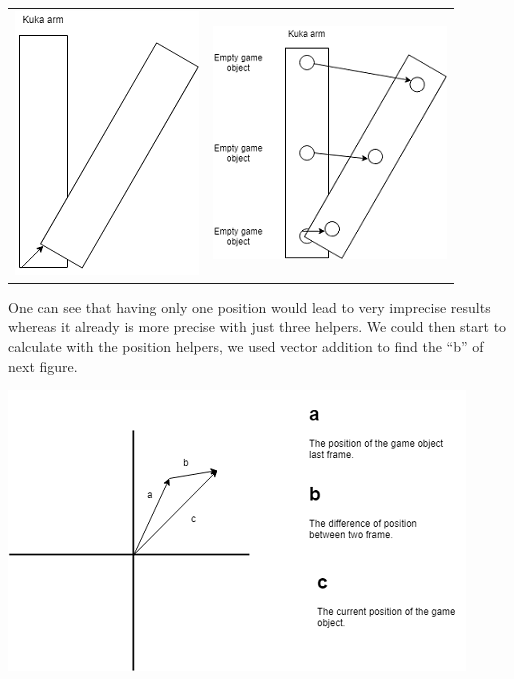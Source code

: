 \documentclass{scrartcl}
\begin{document}
\begin{center}
  \begin{tabular}{c c}
    \includegraphics{position_wo_helper} & \includegraphics{position}
  \end{tabular}
\end{center}

One can see that having only one position would lead to very imprecise results whereas it already is more precise with just three helpers. 
We could then start to calculate with the position helpers, we used vector addition to find the “b” of next figure.

\includegraphics{vector_vitesse}
\end{document}
